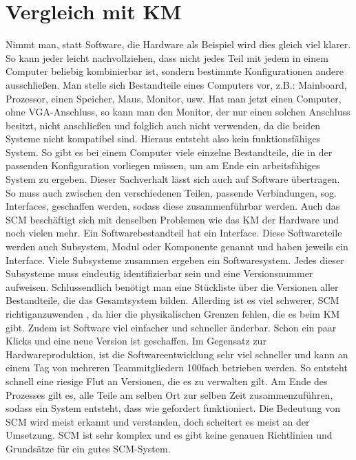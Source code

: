 \section{Vergleich mit KM}
Nimmt man, statt Software, die Hardware als Beispiel wird dies gleich viel klarer. So kann jeder leicht nachvollziehen, dass nicht jedes Teil mit jedem in einem Computer beliebig kombinierbar ist, sondern bestimmte Konfigurationen andere ausschließen. Man stelle sich Bestandteile eines Computers vor, z.B.: Mainboard, Prozessor, einen Speicher, Maus, Monitor, usw. Hat man jetzt einen Computer, ohne VGA-Anschluss, so kann man den Monitor, der nur einen solchen Anschluss besitzt, nicht anschließen und folglich auch nicht verwenden, da die beiden Systeme nicht kompatibel sind. Hieraus entsteht also kein funktionsfähiges System. So gibt es bei einem Computer viele einzelne Bestandteile, die in der passenden Konfiguration vorliegen müssen, um am Ende ein arbeitsfähiges System zu ergeben. Dieser Sachverhalt lässt sich auch auf Software übertragen. So muss auch zwischen den verschiedenen Teilen, passende Verbindungen, sog. Interfaces, geschaffen werden, sodass diese zusammenführbar werden. Auch das SCM beschäftigt sich mit denselben Problemen wie das KM der Hardware und noch vielen mehr. Ein Softwarebestandteil hat ein Interface. 
Diese Softwareteile werden auch Subsystem, Modul oder Komponente genannt und haben jeweils ein Interface. Viele Subsysteme zusammen ergeben ein Softwaresystem. Jedes dieser Subsysteme muss eindeutig identifizierbar sein und eine Versionsnummer aufweisen. Schlussendlich benötigt man eine Stückliste über die Versionen aller Bestandteile, die das Gesamtsystem bilden. Allerding ist es viel schwerer, SCM \Gu richtig\Go anzuwenden , da hier die physikalischen Grenzen fehlen, die es beim KM gibt. Zudem ist Software viel einfacher und schneller änderbar. Schon ein paar Klicks und eine neue Version ist geschaffen. Im  Gegensatz zur Hardwareproduktion, ist die Softwareentwicklung sehr viel schneller und kann an einem Tag von mehreren Teammitgliedern 100fach betrieben werden. So entsteht schnell eine riesige Flut an Versionen, die es zu verwalten gilt. Am Ende des Prozesses gilt es, alle Teile am selben Ort zur selben Zeit zusammenzuführen, sodass ein System entsteht, dass wie gefordert funktioniert. Die Bedeutung von SCM wird meist erkannt und verstanden, doch scheitert es meist an der Umsetzung. SCM ist sehr komplex und es gibt keine genauen Richtlinien und Grundsätze für ein gutes SCM-System. 

